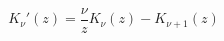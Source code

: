 \documentclass[12pt]{article}
\begin{document}
\begin{displaymath}
K_\nu'(z) = \frac{\nu}{z}K_\nu(z) - K_{\nu+1}(z)
\end{displaymath}
\end{document}
